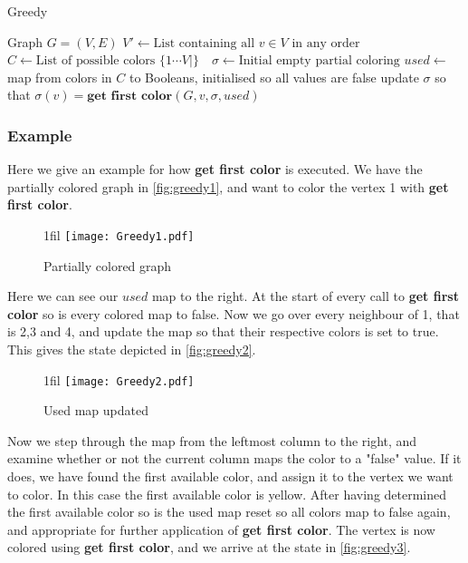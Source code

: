 \documentclass[a4paper]{article}
\makeatletter
\newcommand*{\centerfloat}{%
  \parindent \z@
  \leftskip \z@ \@plus 1fil \@minus \textwidth
  \rightskip\leftskip
  \parfillskip \z@skip}
\makeatother
\begin{document}
\begin{algorithm}[H]
  \caption{Greedy}
  \label{alg:greedy}
  \begin{algorithmic}[1]
      \REQUIRE Graph $G = (V,E)$
      \STATE $V' \leftarrow \text{List containing all $v \in V$ in any order}$
      \STATE $C \leftarrow \text{List of possible colors $\{1 \cdots V| \}$ }$
      \STATE $\sigma \leftarrow \text{Initial empty partial coloring}$
      \STATE $used \leftarrow $ map from colors in $C$ to Booleans, initialised
      so all values are false
        \STATE update $\sigma$ so that  $\sigma(v) = \textbf{get first color}(G,v,\sigma,used)$
    \ENDFOR
  \end{algorithmic}
\end{algorithm}

\subsubsection{Example}

Here we give an example for how \textbf{get first color} is executed.
We have the partially colored graph in \autoref{fig:greedy1}, and want to color the vertex 
1 with \textbf{get first color}.

\begin{figure}[H]
    \centerfloat
    \texttt{[image: Greedy1.pdf]}
    \caption{Partially colored graph}
    \label{fig:greedy1}
\end{figure}

Here we can see our $used$ map to the right. At the start of every call to
\textbf{get first color} so is every colored map to false. Now we go over every
neighbour of 1, that is 2,3 and 4, and update the map so that their respective
colors is set to true. This gives the state depicted in \autoref{fig:greedy2}.

\begin{figure}[H]
    \centerfloat
    \texttt{[image: Greedy2.pdf]}
    \caption{Used map updated}
    \label{fig:greedy2}
\end{figure}

Now we step through the map from the leftmost column to the right, and examine
whether or not the current column maps the color to a "false" value. If it does,
we have found the first available color, and assign it to the vertex we want to
color. In this case the first available color is yellow. After having
determined the first available color so is the used map reset so all colors map
to false again, and appropriate for further application of \textbf{get first
color}.  The vertex is now colored using  \textbf{get first color}, and we
arrive at the state in \autoref{fig:greedy3}.
\end{document}
